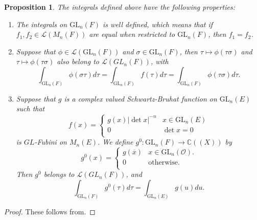 \documentclass{amsart}
\newtheorem{proposition}[theorem]{Proposition}
\theoremstyle{definition}
\theoremstyle{remark}
\numberwithin{equation}{section}
\def  \GL        {\mathrm{GL}}
\def  \cl       {\mathcal{L}}
\def  \co       {\mathcal{O}}
\def  \bc       {\mathbb{C}}
\begin{document}
  
\begin{proposition}
	The integrals defined above have  the following properties:
\begin{enumerate}
\item The integrals on $\GL_n(F)$ is well defined, which means that if $f_1, f_2 \in \cl(M_n(F))$  are equal when restricted to $\GL_n(F)$, then $f_1= f_2$.   

\item Suppose that $\phi \in \cl(\GL_n(F))$ and $\sigma \in \GL_n(F)$, then $\tau \mapsto  \phi( \tau \sigma)$ and $\tau \mapsto  \phi(\tau \sigma)$ also belong to $\cl(GL_n(F))$, with
$$
\int_{\GL_n(F)} \phi(\sigma \tau)  d\tau =  \int_{\GL_n(F)}  f(\tau)  d \tau  =  \int_{\GL_n(F)}  \phi(\tau \sigma)  d \tau.
$$

\item Suppose   that $g$ is a complex valued Schwartz-Bruhat function on $\GL_n(E)$ such that 
$$
f(x)= \left\{
\begin{array}{ll}
	g(x)|\det x|^{-n}  &  x \in \GL_n(E)  \\
	0     &   \det x =0  \\
\end{array}
\right.
$$
is $GL$-Fubini on $M_n(E)$.  We define $g^0 : \GL_n(F) \to \bc((X))$ by 
$$
g^0(x) = \left\{
\begin{array}{ll}
	g(\overline{x})  &   x   \in  \GL_n(\co).  \\
	0   &  \text{otherwise}. \\  
\end{array}
\right.
$$Then $g^0$ belongs to $\cl(GL_n(F))$, and
$$
\int_{\GL_n(F)}  g^{0}  (\tau)  d\tau  = \int_{\GL_n(E)} g(u) du.
$$
\end{enumerate}

\end{proposition}
\begin{proof}
	These  follows from\cite[Remark 4.3, Proposition 4.4, Proposition 4.8]{morrow2008integration}.                                                                                                                                                                                                                                                                                                                                                                                                                                                                                                                                                                                                                                                                                                                                                                                                                                                                                                                                                                                                                                                                                                                                                                                                                              
\end{proof}
\end{document}
